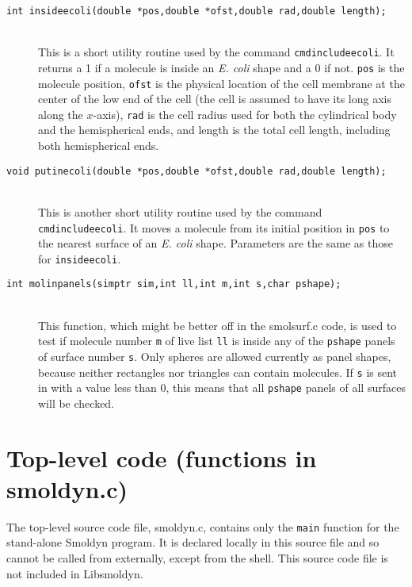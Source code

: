 \documentclass {book}
\begin{document}
\begin{description}
\item[\texttt{int insideecoli(double *pos,double *ofst,double rad,double length);}]
\hfill \\
This is a short utility routine used by the command \texttt{cmdincludeecoli}.  It returns a 1 if a molecule is inside an \emph{E. coli} shape and a 0 if not.  \texttt{pos} is the molecule position, \texttt{ofst} is the physical location of the cell membrane at the center of the low end of the cell (the cell is assumed to have its long axis along the $x$-axis), \texttt{rad} is the cell radius used for both the cylindrical body and the hemispherical ends, and length is the total cell length, including both hemispherical ends.

\item[\texttt{void putinecoli(double *pos,double *ofst,double rad,double length);}]
\hfill \\
This is another short utility routine used by the command \texttt{cmdincludeecoli}.  It moves a molecule from its initial position in \texttt{pos} to the nearest surface of an \emph{E. coli} shape.  Parameters are the same as those for \texttt{insideecoli}.

\item[\texttt{int molinpanels(simptr sim,int ll,int m,int s,char pshape);}]
\hfill \\
This function, which might be better off in the smolsurf.c code, is used to test if molecule number \texttt{m} of live list \texttt{ll} is inside any of the \texttt{pshape} panels of surface number \texttt{s}.  Only spheres are allowed currently as panel shapes, because neither rectangles nor triangles can contain molecules.  If \texttt{s} is sent in with a value less than 0, this means that all \texttt{pshape} panels of all surfaces will be checked.

\end{description}

\section{Top-level code (functions in smoldyn.c)}

The top-level source code file, smoldyn.c, contains only the \texttt{main} function for the stand-alone Smoldyn program.  It is declared locally in this source file and so cannot be called from externally, except from the shell.  This source code file is not included in Libsmoldyn.
\end{document}

